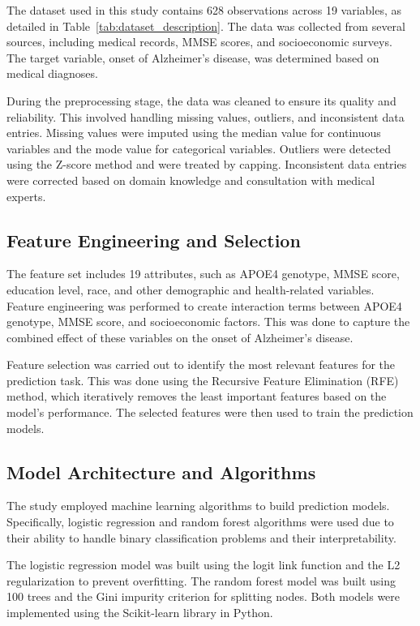 \documentclass[conference]{IEEEtran}
\begin{document}
The dataset used in this study contains 628 observations across 19 variables, as detailed in Table~\ref{tab:dataset_description}. The data was collected from several sources, including medical records, MMSE scores, and socioeconomic surveys. The target variable, onset of Alzheimer's disease, was determined based on medical diagnoses.

During the preprocessing stage, the data was cleaned to ensure its quality and reliability. This involved handling missing values, outliers, and inconsistent data entries. Missing values were imputed using the median value for continuous variables and the mode value for categorical variables. Outliers were detected using the Z-score method and were treated by capping. Inconsistent data entries were corrected based on domain knowledge and consultation with medical experts.

\subsection{Feature Engineering and Selection}

The feature set includes 19 attributes, such as APOE4 genotype, MMSE score, education level, race, and other demographic and health-related variables. Feature engineering was performed to create interaction terms between APOE4 genotype, MMSE score, and socioeconomic factors. This was done to capture the combined effect of these variables on the onset of Alzheimer's disease.

Feature selection was carried out to identify the most relevant features for the prediction task. This was done using the Recursive Feature Elimination (RFE) method, which iteratively removes the least important features based on the model's performance. The selected features were then used to train the prediction models.

\subsection{Model Architecture and Algorithms}

The study employed machine learning algorithms to build prediction models. Specifically, logistic regression and random forest algorithms were used due to their ability to handle binary classification problems and their interpretability.

The logistic regression model was built using the logit link function and the L2 regularization to prevent overfitting. The random forest model was built using 100 trees and the Gini impurity criterion for splitting nodes. Both models were implemented using the Scikit-learn library in Python.
\end{document}
